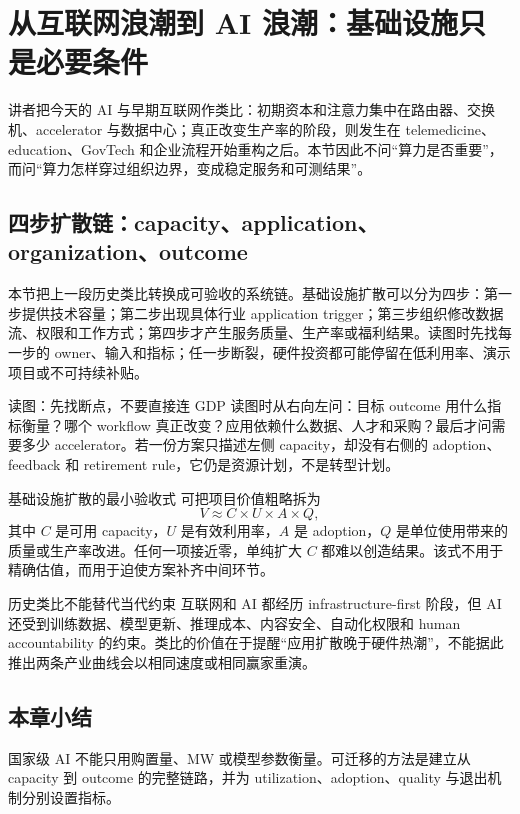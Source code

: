 \section{从互联网浪潮到 AI 浪潮：基础设施只是必要条件}

讲者把今天的 AI 与早期互联网作类比：初期资本和注意力集中在路由器、交换机、accelerator 与数据中心；真正改变生产率的阶段，则发生在 telemedicine、education、GovTech 和企业流程开始重构之后。本节因此不问“算力是否重要”，而问“算力怎样穿过组织边界，变成稳定服务和可测结果”。

\subsection{四步扩散链：capacity、application、organization、outcome}

本节把上一段历史类比转换成可验收的系统链。基础设施扩散可以分为四步：第一步提供技术容量；第二步出现具体行业 application trigger；第三步组织修改数据流、权限和工作方式；第四步才产生服务质量、生产率或福利结果。读图时先找每一步的 owner、输入和指标；任一步断裂，硬件投资都可能停留在低利用率、演示项目或不可持续补贴。


\begin{knowledgebox}{读图：先找断点，不要直接连 GDP}
读图时从右向左问：目标 outcome 用什么指标衡量？哪个 workflow 真正改变？应用依赖什么数据、人才和采购？最后才问需要多少 accelerator。若一份方案只描述左侧 capacity，却没有右侧的 adoption、feedback 和 retirement rule，它仍是资源计划，不是转型计划。
\end{knowledgebox}

\begin{importantbox}{基础设施扩散的最小验收式}
可把项目价值粗略拆为
\[
V \approx C\times U\times A\times Q,
\]
其中 $C$ 是可用 capacity，$U$ 是有效利用率，$A$ 是 adoption，$Q$ 是单位使用带来的质量或生产率改进。任何一项接近零，单纯扩大 $C$ 都难以创造结果。该式不用于精确估值，而用于迫使方案补齐中间环节。
\end{importantbox}

\begin{warningbox}{历史类比不能替代当代约束}
互联网和 AI 都经历 infrastructure-first 阶段，但 AI 还受到训练数据、模型更新、推理成本、内容安全、自动化权限和 human accountability 的约束。类比的价值在于提醒“应用扩散晚于硬件热潮”，不能据此推出两条产业曲线会以相同速度或相同赢家重演。
\end{warningbox}

\subsection{本章小结}

国家级 AI 不能只用购置量、MW 或模型参数衡量。可迁移的方法是建立从 capacity 到 outcome 的完整链路，并为 utilization、adoption、quality 与退出机制分别设置指标。


